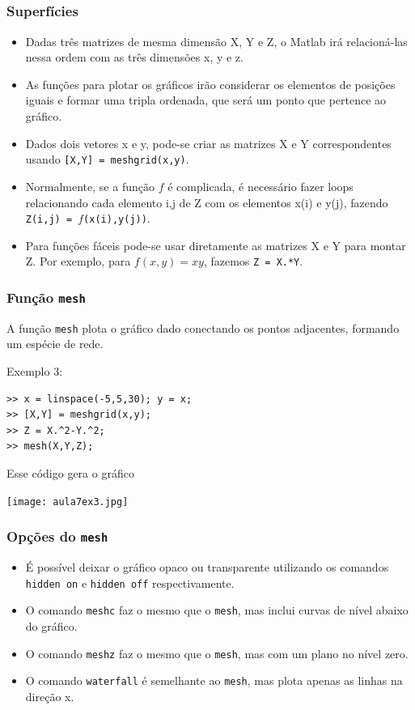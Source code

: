 \documentclass{beamer}
\begin{document}
\subsection[Superf\'icies]{}

\begin{frame}[fragile]
\frametitle{Superf\'icies}
\begin{itemize}
 \item<1-> Dadas tr\^es matrizes de mesma dimens\~ao X, Y e Z, o Matlab ir\'a
relacion\'a-las nessa ordem com as tr\^es dimens\~oes x, y e z.
 \item<2-> As fun\c{c}\~oes para plotar os gr\'aficos ir\~ao considerar os
elementos de posi\c{c}\~oes iguais e formar uma tripla ordenada, que ser\'a um
ponto que pertence ao gr\'afico.
 \item<3-> Dados dois vetores x e y, pode-se criar as matrizes X e Y
correspondentes usando {\tt [X,Y] = meshgrid(x,y)}.
 \item<4-> Normalmente, se a fun\c{c}\~ao $f$ \'e complicada, \'e necess\'ario
fazer loops relacionando cada elemento i,j de Z com os elementos x(i) e y(j),
fazendo {\tt Z(i,j) = $f$(x(i),y(j))}.
 \item<5-> Para fun\c{c}\~oes f\'aceis pode-se usar diretamente as matrizes X e
Y para montar Z. Por exemplo, para $f(x,y) = xy$, fazemos {\tt Z = X.*Y}.
\end{itemize}

\end{frame}

\begin{frame}[fragile]
\frametitle{Fun\c{c}\~ao {\tt mesh}}
A fun\c{c}\~ao {\tt mesh} plota o gr\'afico dado conectando os pontos
adjacentes, formando um esp\'ecie de rede.

Exemplo 3:
{\scriptsize
\begin{verbatim}
>> x = linspace(-5,5,30); y = x;
>> [X,Y] = meshgrid(x,y);
>> Z = X.^2-Y.^2;
>> mesh(X,Y,Z);
\end{verbatim}}
\pause
Esse c\'odigo gera o gr\'afico
\begin{center}
\texttt{[image: aula7ex3.jpg]}
\end{center}
\end{frame}

\begin{frame}[fragile]
\frametitle{Op\c{c}\~oes do {\tt mesh}}
\begin{itemize}
\item<1-> \'E poss\'ivel deixar o gr\'afico opaco ou transparente utilizando os
comandos {\tt hidden on} e {\tt hidden off} respectivamente.
\item<2-> O comando {\tt meshc} faz o mesmo que o {\tt mesh}, mas inclui curvas
de n\'ivel abaixo do gr\'afico.
\item<3-> O comando {\tt meshz} faz o mesmo que o {\tt mesh}, mas com um plano
no n\'ivel zero.
\item<4-> O comando {\tt waterfall} \'e semelhante ao {\tt mesh}, mas plota
apenas as linhas na dire\c{c}\~ao x.
\end{itemize}
\end{frame}
\end{document}
